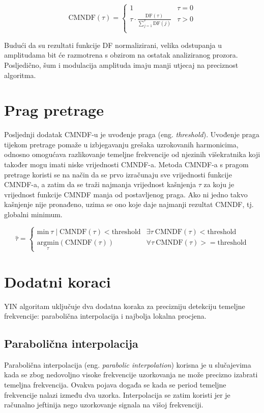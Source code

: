 \documentclass[times, utf8, diplomski, numeric]{fer}
\begin{document}
\begin{equation}
	\mathrm{CMNDF}(\tau) =
	\begin{cases}
		1 & \tau = 0 \\
		\tau \cdot \frac{\mathrm{DF}(\tau)}{\sum_{j = 1}^{\tau}{\mathrm{DF}(j)}} & \tau > 0 \\
	\end{cases}
\end{equation}

Budući da su rezultati funkcije DF normalizirani, velika odstupanja u amplitudama bit će razmotrena s obzirom na ostatak analiziranog prozora. Posljedično, šum i modulacija amplituda imaju manji utjecaj na preciznost algoritma.


\section{Prag pretrage}
%
Posljednji dodatak CMNDF-u je uvođenje praga (eng. \textit{threshold}). Uvođenje praga tijekom pretrage pomaže u izbjegavanju grešaka uzrokovanih harmonicima, odnosno omogućava razlikovanje temeljne frekvencije od njezinih višekratnika koji također mogu imati niske vrijednosti CMNDF-a. Metoda CMNDF-a s pragom pretrage koristi se na način da se prvo izračunaju sve vrijednosti funkcije CMNDF-a, a zatim da se traži najmanja vrijednost kašnjenja $\tau$ za koju je vrijednost funkcije CMNDF manja od postavljenog praga. Ako ni jedno takvo kašnjenje nije pronađeno, uzima se ono koje daje najmanji rezultat CMNDF, tj. globalni minimum.

\begin{equation}
	\hat{\tau} =
	\begin{cases}
		\mathrm{min} \ \tau \mid \mathrm{CMNDF}(\tau) < \mathrm{threshold} & \exists \tau \ \mathrm{CMNDF}(\tau) < \mathrm{threshold} \\
		\underset{\tau}{\mathrm{argmin}} (\mathrm{CMNDF}(\tau)) & \forall \tau \ \mathrm{CMNDF}(\tau) >= \mathrm{threshold}
	\end{cases}
\end{equation}
 
\section{Dodatni koraci}
%
YIN algoritam uključuje dva dodatna koraka za precizniju detekciju temeljne frekvencije: parabolična interpolacija i najbolja lokalna procjena.

\subsection{Parabolična interpolacija}
%
Parabolična interpolacija (eng. \textit{parabolic interpolation}) korisna je u slučajevima kada se zbog nedovoljno visoke frekvencije uzorkovanja ne može precizno izabrati temeljna frekvencija. Ovakva pojava događa se kada se period temeljne frekvencije nalazi između dva uzorka. Interpolacija se zatim koristi jer je računalno jeftinija nego uzorkovanje signala na višoj frekvenciji. 
\end{document}
